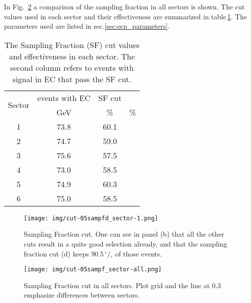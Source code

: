 In Fig.~\ref{fig:ecp_all_sectors} a comparison of the sampling fraction in all sectors is shown.
The cut values used in each sector and their effectiveness are summarized in 
table\,\ref{tab:sfcut}. The parameters used are listed in sec.\ref{sec:ecp_parameters}.

\begin{table}[h]
\label{tab:sfcut}
	\begin{center}
		\begin{tabular}{c | c | c | c}
			\hline 
			\multirow{2}{*}{Sector} 
					& events with EC & SF cut\\
					&  GeV & \% & \% \\
			\hline
			1   & 73.8 & 60.1 \\
			2   & 74.7 & 59.0 \\
			3   & 75.6 & 57.5 \\
			4   & 73.0 & 58.5 \\
			5   & 74.9 & 60.3 \\
			6   & 75.0 & 58.5 \\
			\hline 
		\end{tabular}
		\caption{The Sampling Fraction (SF) cut values and effectiveness in each sector.
					The second column refers to events with signal in EC that pass the SF cut.}	
	\end{center}
\end{table}


\begin{figure}[ht]
  \centering
		\texttt{[image: img/cut-05sampfd\_sector-1.png]}
		\caption{Sampling Fraction cut. One can see in panel (b) that all the other cuts 
		result in a quite good selection already, and that the sampling fraction cut (d) keeps  
		$90.5\,^{\circ\!\!}/\!_\circ$ of those events.}
 		\label{fig:sampling_fractioncut_s1}
\end{figure}

\clearpage\newpage
\begin{figure}[ht]
  \centering
		\texttt{[image: img/cut-05sampf\_sector-all.png]}
		\caption{Sampling Fraction cut in all sectors. Plot grid and 
					the line at 0.3 emphasize differences between sectors.}
 		\label{fig:ecp_all_sectors}
\end{figure}

